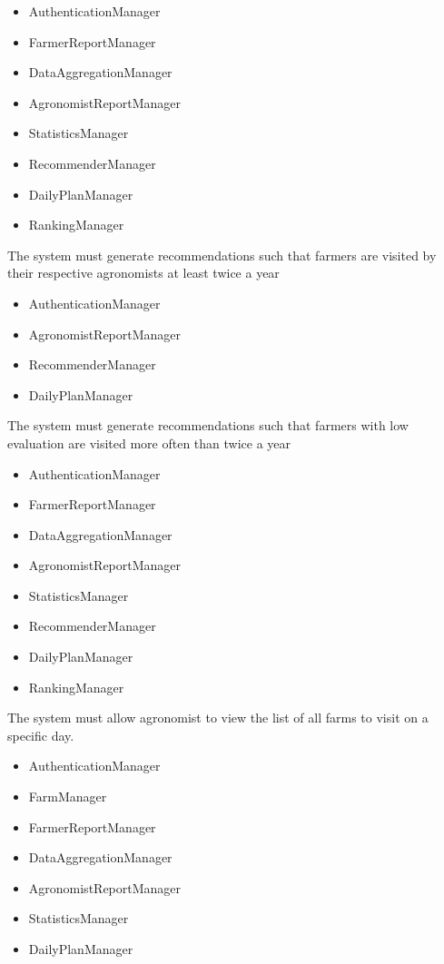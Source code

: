 \begin{itemize}
\begin{itemize}
\item AuthenticationManager
\item FarmerReportManager
\item DataAggregationManager
\item AgronomistReportManager
\item StatisticsManager
\item RecommenderManager
\item DailyPlanManager
\item RankingManager

\end{itemize}

  The system must generate recommendations such that farmers are visited by their respective agronomists at least twice a year

\begin{itemize}

\item AuthenticationManager
\item AgronomistReportManager
\item RecommenderManager
\item DailyPlanManager

\end{itemize}
  The system must generate recommendations such that farmers with low evaluation are visited more often than twice a year
\begin{itemize}

\item AuthenticationManager
\item FarmerReportManager
\item DataAggregationManager
\item AgronomistReportManager
\item StatisticsManager
\item RecommenderManager
\item DailyPlanManager
\item RankingManager

\end{itemize}
  The system must allow agronomist to view the list of all farms to visit on a specific day.
\begin{itemize}

\item AuthenticationManager
\item FarmManager
\item FarmerReportManager
\item DataAggregationManager
\item AgronomistReportManager
\item StatisticsManager
\item DailyPlanManager



\end{itemize}
\end{itemize}
